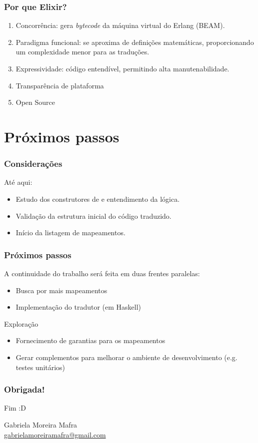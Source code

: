 \documentclass{beamer}
\begin{document}
\begin{frame}
  \frametitle{Por que Elixir?}

  \begin{enumerate}
    \item Concorrência: gera \textit{bytecode} da máquina virtual do Erlang (BEAM).

    \item Paradigma funcional: se aproxima de definições matemáticas, proporcionando um complexidade menor para as traduções.

    \item Expressividade: código entendível, permitindo alta manutenabilidade.

    \item Transparência de plataforma

    \item Open Source

  \end{enumerate}
\end{frame}

\section{Próximos passos}

\begin{frame}
  \frametitle{Considerações}

  Até aqui:
  \begin{itemize}
    \item Estudo dos construtores de \TLA e entendimento da lógica.
    \item Validação da estrutura inicial do código traduzido.
    \item Início da listagem de mapeamentos.
  \end{itemize}

\end{frame}

\begin{frame}
  \frametitle{Próximos passos}

  A continuidade do trabalho será feita em duas frentes paralelas:
  \begin{itemize}
    \item Busca por mais mapeamentos
    \item Implementação do tradutor (em Haskell)
  \end{itemize}\medskip\pause

  \begin{block}{Exploração}
    \begin{itemize}
      \item Fornecimento de garantias para os mapeamentos
      \item Gerar complementos para melhorar o ambiente de desenvolvimento (e.g. testes unitários)
    \end{itemize}
  \end{block}

\end{frame}

\begin{frame}
  \frametitle{Obrigada!}

  {\Huge Fim :D}\bigskip

  Gabriela Moreira Mafra\\\smallskip
  {\url{gabrielamoreiramafra@gmail.com}}

\end{frame}
\end{document}
